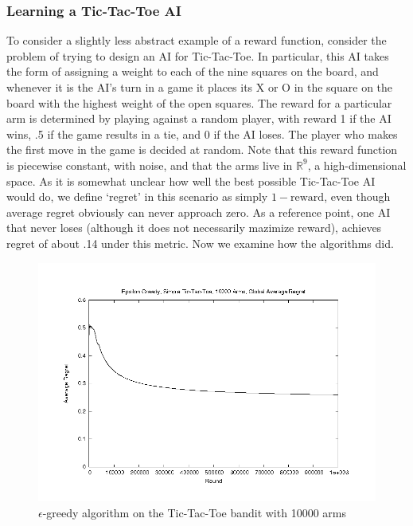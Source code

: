 \subsubsection{Learning a Tic-Tac-Toe AI}
To consider a slightly less abstract example of a reward function, 
consider the problem of trying to design an AI for Tic-Tac-Toe.  In
particular, this AI takes the form of assigning a weight to each of the
nine squares on the board, and whenever it is the AI's turn in a game it
places its X or O in the square on the board with the highest weight of
the open squares.  The reward for a particular arm is determined by
playing against a random player, with reward 1 if the AI wins, .5 if the
game results in a tie, and 0 if the AI loses.  The player who makes the
first move in the game is decided at random.  Note that this reward 
function is piecewise constant, with noise, and that the arms live in
$\mathbb{R}^9$, a high-dimensional space.  As it is somewhat unclear
how well the best possible Tic-Tac-Toe AI would do, we define `regret'
in this scenario as simply $1-\text{reward}$, even though average regret
obviously can never approach zero.  As a reference point, one AI that never
loses (although it does not necessarily mazimize reward), achieves regret of
about .14 under this metric.  Now we examine how the algorithms did.

\begin{figure}[!ht]
  \begin{center}
    \includegraphics[width=\figwidth]{data/tictactoe/egtoe10000_GA.png}
     \caption{$\epsilon$-greedy algorithm on the Tic-Tac-Toe bandit with
     10000 arms}
     \label{fig:egtoe}
  \end{center}
\end{figure}

